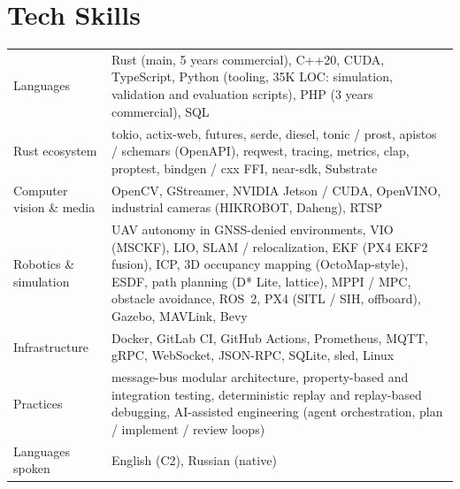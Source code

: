 \documentclass[a4paper,11pt]{article}
\begin{document}
\section{Tech Skills}
\begin{tabularx}{\linewidth}{@{}l X@{}}
Languages & \normalsize{Rust (main, 5 years commercial), C++20, CUDA, TypeScript, Python (tooling, 35K LOC: simulation, validation and evaluation scripts), PHP (3 years commercial), SQL}\\
Rust ecosystem & \normalsize{tokio, actix-web, futures, serde, diesel, tonic / prost, apistos / schemars (OpenAPI), reqwest, tracing, metrics, clap, proptest, bindgen / cxx FFI, near-sdk, Substrate}\\
Computer vision \& media & \normalsize{OpenCV, GStreamer, NVIDIA Jetson / CUDA, OpenVINO, industrial cameras (HIKROBOT, Daheng), RTSP}\\
Robotics \& simulation & \normalsize{UAV autonomy in GNSS-denied environments, VIO (MSCKF), LIO, SLAM / relocalization, EKF (PX4 EKF2 fusion), ICP, 3D occupancy mapping (OctoMap-style), ESDF, path planning (D* Lite, lattice), MPPI / MPC, obstacle avoidance, ROS~2, PX4 (SITL / SIH, offboard), Gazebo, MAVLink, Bevy}\\
Infrastructure & \normalsize{Docker, GitLab CI, GitHub Actions, Prometheus, MQTT, gRPC, WebSocket, JSON-RPC, SQLite, sled, Linux}\\
Practices & \normalsize{message-bus modular architecture, property-based and integration testing, deterministic replay and replay-based debugging, AI-assisted engineering (agent orchestration, plan / implement / review loops)}\\
Languages spoken & \normalsize{English (C2), Russian (native)}\\
\end{tabularx}

\vfill
{}
\end{document}
